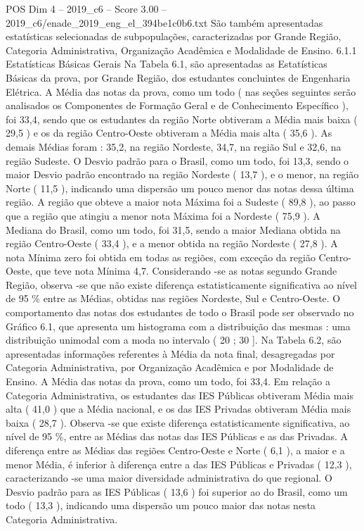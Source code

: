 \begin{textsample}{POS Dim 4 – 2019\_c6 – Score 3.00 – 2019\_c6/enade\_2019\_eng\_el\_394be1c0b6.txt}
São também apresentadas estatísticas selecionadas de subpopulações, caracterizadas por Grande Região, Categoria Administrativa, Organização Acadêmica e Modalidade de Ensino. 6.1.1 Estatísticas Básicas Gerais Na Tabela 6.1, são apresentadas as Estatísticas Básicas da prova, por Grande Região, dos estudantes concluintes de Engenharia Elétrica.
A Média das notas da prova, como um todo ( nas seções seguintes serão analisados os Componentes de Formação Geral e de Conhecimento Específico ), foi 33,4, sendo que os estudantes da região Norte obtiveram a Média mais baixa ( 29,5 ) e os da região Centro-Oeste obtiveram a Média mais alta ( 35,6 ).
As demais Médias foram : 35,2, na região Nordeste, 34,7, na região Sul e 32,6, na região Sudeste.
O Desvio padrão para o Brasil, como um todo, foi 13,3, sendo o maior Desvio padrão encontrado na região Nordeste ( 13,7 ), e o menor, na região Norte ( 11,5 ), indicando uma dispersão um pouco menor das notas dessa última região.
A região que obteve a maior nota Máxima foi a Sudeste ( 89,8 ), ao passo que a região que atingiu a menor nota Máxima foi a Nordeste ( 75,9 ).
A Mediana do Brasil, como um todo, foi 31,5, sendo a maior Mediana obtida na região Centro-Oeste ( 33,4 ), e a menor obtida na região Nordeste ( 27,8 ).
A nota Mínima zero foi obtida em todas as regiões, com exceção da região Centro-Oeste, que teve nota Mínima 4,7.
Considerando -se as notas segundo Grande Região, observa -se que não existe diferença estatisticamente significativa ao nível de 95 \% entre as Médias, obtidas nas regiões Nordeste, Sul e Centro-Oeste.
O comportamento das notas dos estudantes de todo o Brasil pode ser observado no Gráfico 6.1, que apresenta um histograma com a distribuição das mesmas : uma distribuição unimodal com a moda no intervalo ( 20 ; 30 ].
Na Tabela 6.2, são apresentadas informações referentes à Média da nota final, desagregadas por Categoria Administrativa, por Organização Acadêmica e por Modalidade de Ensino.
A Média das notas da prova, como um todo, foi 33,4.
Em relação a Categoria Administrativa, os estudantes das IES Públicas obtiveram Média mais alta ( 41,0 ) que a Média nacional, e os das IES Privadas obtiveram Média mais baixa ( 28,7 ).
Observa -se que existe diferença estatisticamente significativa, ao nível de 95 \%, entre as Médias das notas das IES Públicas e as das Privadas.
A diferença entre as Médias das regiões Centro-Oeste e Norte ( 6,1 ), a maior e a menor Média, é inferior à diferença entre a das IES Públicas e Privadas ( 12,3 ), caracterizando -se uma maior diversidade administrativa do que regional.
O Desvio padrão para as IES Públicas ( 13,6 ) foi superior ao do Brasil, como um todo ( 13,3 ), indicando uma dispersão um pouco maior das notas nesta Categoria Administrativa.

\end{textsample}
